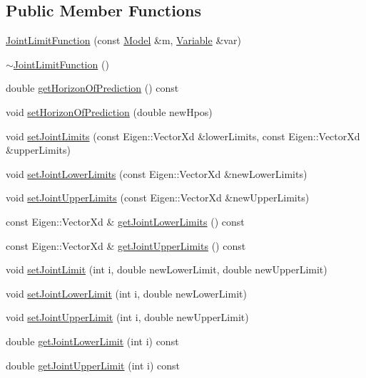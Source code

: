 \subsection*{Public Member Functions}
\begin{DoxyCompactItemize}
\item 
\hyperlink{classocra_1_1JointLimitFunction_a00952411e7a7906fc6e5aedcfcfc6bc3}{Joint\+Limit\+Function} (const \hyperlink{classocra_1_1Model}{Model} \&m, \hyperlink{classocra_1_1Variable}{Variable} \&var)
\item 
\hyperlink{classocra_1_1JointLimitFunction_aa028e738a7dd0e89ef05628abf32d79f}{$\sim$\+Joint\+Limit\+Function} ()
\item 
double \hyperlink{classocra_1_1JointLimitFunction_ad7afccc24fc2bc685583bfd5032ca568}{get\+Horizon\+Of\+Prediction} () const
\item 
void \hyperlink{classocra_1_1JointLimitFunction_a02dfaf445e997387b2fd915bc398dc73}{set\+Horizon\+Of\+Prediction} (double new\+Hpos)
\item 
void \hyperlink{classocra_1_1JointLimitFunction_a9647e0888530d880ff412a057f83295d}{set\+Joint\+Limits} (const Eigen\+::\+Vector\+Xd \&lower\+Limits, const Eigen\+::\+Vector\+Xd \&upper\+Limits)
\item 
void \hyperlink{classocra_1_1JointLimitFunction_af08943f266069853dce1c491ef7f4e08}{set\+Joint\+Lower\+Limits} (const Eigen\+::\+Vector\+Xd \&new\+Lower\+Limits)
\item 
void \hyperlink{classocra_1_1JointLimitFunction_a661a85585b10ec71cbbbe6cb12523507}{set\+Joint\+Upper\+Limits} (const Eigen\+::\+Vector\+Xd \&new\+Upper\+Limits)
\item 
const Eigen\+::\+Vector\+Xd \& \hyperlink{classocra_1_1JointLimitFunction_ae9a3d083f00c608ed09a687447d086f1}{get\+Joint\+Lower\+Limits} () const
\item 
const Eigen\+::\+Vector\+Xd \& \hyperlink{classocra_1_1JointLimitFunction_aeed410787750256bdd52fdd5ca3c519f}{get\+Joint\+Upper\+Limits} () const
\item 
void \hyperlink{classocra_1_1JointLimitFunction_a41432c4d8d08c17e90892a26963d3d5e}{set\+Joint\+Limit} (int i, double new\+Lower\+Limit, double new\+Upper\+Limit)
\item 
void \hyperlink{classocra_1_1JointLimitFunction_a490c1e19dd3897097a61d616a3e1709d}{set\+Joint\+Lower\+Limit} (int i, double new\+Lower\+Limit)
\item 
void \hyperlink{classocra_1_1JointLimitFunction_a0f83df6fab80175c07070c00d26a41b5}{set\+Joint\+Upper\+Limit} (int i, double new\+Upper\+Limit)
\item 
double \hyperlink{classocra_1_1JointLimitFunction_aa5ad56143f8d257e89b308cabb5fd560}{get\+Joint\+Lower\+Limit} (int i) const
\item 
double \hyperlink{classocra_1_1JointLimitFunction_ae39c838b6618f3d1dded5aad16751e60}{get\+Joint\+Upper\+Limit} (int i) const
\end{DoxyCompactItemize}
